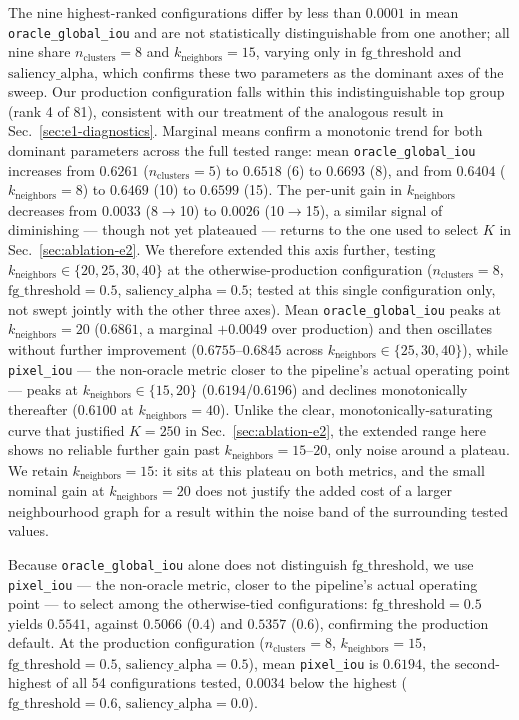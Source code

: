 The nine highest-ranked configurations differ by less than $0.0001$ in mean
\texttt{oracle\_global\_iou} and are not statistically distinguishable from
one another; all nine share $n_{\text{clusters}}=8$ and $k_{\text{neighbors}}=15$,
varying only in $\text{fg\_threshold}$ and $\text{saliency\_alpha}$, which
confirms these two parameters as the dominant axes of the sweep. Our
production configuration falls within this indistinguishable top group
(rank 4 of 81), consistent with our treatment of the analogous result in
Sec.~\ref{sec:e1-diagnostics}. Marginal means confirm a monotonic trend for
both dominant parameters across the full tested range: mean
\texttt{oracle\_global\_iou} increases from $0.6261$ ($n_{\text{clusters}}=5$)
to $0.6518$ (6) to $0.6693$ (8), and from $0.6404$ ($k_{\text{neighbors}}=8$)
to $0.6469$ (10) to $0.6599$ (15). The per-unit gain in $k_{\text{neighbors}}$
decreases from $0.0033$ (8$\to$10) to $0.0026$ (10$\to$15), a similar signal
of diminishing --- though not yet plateaued --- returns to the one used to
select $K$ in Sec.~\ref{sec:ablation-e2}. We therefore extended this axis
further, testing $k_{\text{neighbors}} \in \{20,25,30,40\}$ at the
otherwise-production configuration ($n_{\text{clusters}}=8$,
$\text{fg\_threshold}=0.5$, $\text{saliency\_alpha}=0.5$; tested at this
single configuration only, not swept jointly with the other three axes).
Mean \texttt{oracle\_global\_iou} peaks at $k_{\text{neighbors}}=20$
($0.6861$, a marginal $+0.0049$ over production) and then oscillates
without further improvement ($0.6755$--$0.6845$ across
$k_{\text{neighbors}} \in \{25,30,40\}$), while \texttt{pixel\_iou} ---
the non-oracle metric closer to the pipeline's actual operating point ---
peaks at $k_{\text{neighbors}} \in \{15,20\}$ ($0.6194$/$0.6196$) and
declines monotonically thereafter ($0.6100$ at $k_{\text{neighbors}}=40$).
Unlike the clear, monotonically-saturating curve that justified $K=250$ in
Sec.~\ref{sec:ablation-e2}, the extended range here shows no reliable
further gain past $k_{\text{neighbors}}=15$--$20$, only noise around a
plateau. We retain $k_{\text{neighbors}}=15$: it sits at this plateau on
both metrics, and the small nominal gain at $k_{\text{neighbors}}=20$ does
not justify the added cost of a larger neighbourhood graph for a result
within the noise band of the surrounding tested values.

Because \texttt{oracle\_global\_iou} alone does not distinguish
$\text{fg\_threshold}$, we use \texttt{pixel\_iou} --- the non-oracle metric,
closer to the pipeline's actual operating point --- to select among the
otherwise-tied configurations: $\text{fg\_threshold}=0.5$ yields
$0.5541$, against $0.5066$ ($0.4$) and $0.5357$ ($0.6$), confirming the
production default. At the production configuration
($n_{\text{clusters}}=8$, $k_{\text{neighbors}}=15$,
$\text{fg\_threshold}=0.5$, $\text{saliency\_alpha}=0.5$), mean
\texttt{pixel\_iou} is $0.6194$, the second-highest of all 54 configurations
tested, $0.0034$ below the highest ($\text{fg\_threshold}=0.6$,
$\text{saliency\_alpha}=0.0$).

